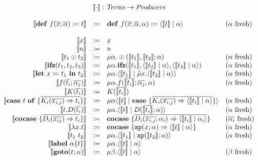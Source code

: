 \documentclass[nonacm]{acmart}
\newcommand{\translate}[1]{\ensuremath{\llbracket#1 \rrbracket}}
\newcommand{\cut}[2]{\ensuremath{\langle #1 \mid #2 \rangle}}
\newcommand{\letin}[3]{\ensuremath{\mathbf{let}\ #1 \coloneqq #2\ \mathbf{in}\ #3}}
\newcommand{\caseof}[2]{\ensuremath{\mathbf{case}\ #1\ \mathbf{of}\ \{ #2 \}}}
\newcommand{\fresh}[1]{\ensuremath{(#1\text{ fresh})}}
\begin{document}
\[
  \begin{array}{rcll}
    \multicolumn{4}{c}{\translate{\cdot} : \emph{Terms} \rightarrow \emph{Producers}}\\
    \\
    \translate{\mathbf{def}\ f(\overline{x};\overline{\alpha}) \coloneq t} & \coloneq & \mathbf{def}\ f(\overline{x};\overline{\alpha},\alpha) \coloneq \cut{\translate{t}}{\alpha} & \fresh{\alpha}\\
  \quad \\
    \translate{x} & \coloneq & x & \\
    \translate{n} & \coloneq & n & \\
    \translate{t_1 \odot t_2} & \coloneq & \mu \alpha.\odot(\translate{t_1},\translate{t_2};\alpha) & \fresh{\alpha}\\
    \translate{\mathbf{ifz}(t_1,t_2,t_3)} & \coloneq & \mu \alpha.\mathbf{ifz}(\translate{t_1},\cut{\translate{t_2}}{\alpha},\cut{\translate{t_3}}{\alpha}) & \fresh{\alpha}\\
    \translate{\letin{x}{t_1}{t_2}} & \coloneq & \mu \alpha.\cut{\translate{t_1}}{\tilde{\mu}x.\cut{\translate{t_2}}{\alpha}} & \fresh{\alpha}\\
    \translate{f(\overline{t_i};\overline{\alpha_j})} & \coloneq & \mu \alpha.f(\overline{\translate{t_i}};\overline{\alpha_j},\alpha) & \fresh{\alpha}\\
    \translate{K(\overline{t_i})} & \coloneq & K(\overline{\translate{t_i}}) & \\
    \translate{\caseof{t}{\overline{K_i(\overline{x_{i,j}}) \Rightarrow t_i}}} & \coloneq & \mu \alpha \cut{\translate{t}}{\mathbf{case}\ \{ \overline{K_i(\overline{x_{i,j}}) \Rightarrow \cut{\translate{t_i}}{\alpha}}\}} & \fresh{\alpha}\\
    \translate{t.D(\overline{t_i})} & \coloneq & \mu\alpha.\cut{\translate{t}}{D(\overline{\translate{t_i}};\alpha)} & \fresh{\alpha}\\
    \translate{\mathbf{cocase}\ \{\overline{D_i(\overline{x_{ij}})\Rightarrow t_i}\}} & \coloneq & \mathbf{cocase}\ \{ \overline{D_i(\overline{x_{i,j}};\alpha_i)\Rightarrow \cut{\translate{t_i}}{\alpha_i}} \} & \fresh{\overline{\alpha_i}}\\
    \translate{\lambda x.t} & \coloneq & \mathbf{cocase}\ \{ \mathtt{ap}(x;\alpha) \Rightarrow \cut{\translate{t}}{\alpha}\} & \fresh{\alpha}\\
    \translate{t_1\ t_2} & \coloneq & \mu \alpha. \cut{\translate{t_1}}{\mathtt{ap}(\translate{t_2};\alpha)} & \fresh{\alpha}\\
    \translate{\mathbf{label}\ \alpha \{t\}} & \coloneq & \mu\alpha. \cut{\translate{t}}{\alpha} & \\
    \translate{\mathbf{goto}(t;\alpha)} & \coloneq & \mu\beta.\cut{\translate{t}}{\alpha} & \fresh{\beta}
  \end{array}
\]
\end{document}
